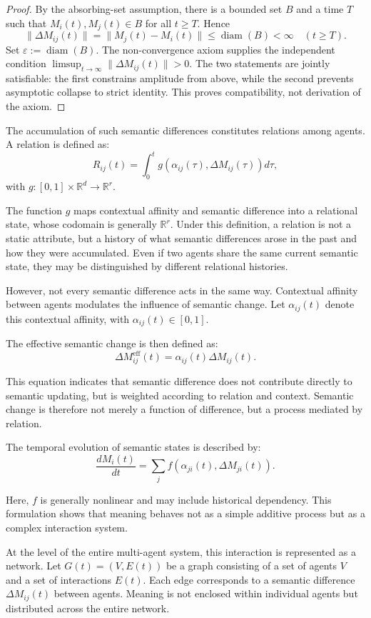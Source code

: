 \documentclass[11pt,a4paper]{article}
\theoremstyle{definition}
\begin{document}
\begin{proof}
By the absorbing-set assumption, there is a bounded set $B$ and a time $T$ such that $M_i(t),M_j(t)\in B$ for all $t\geq T$. Hence
\[
\|\Delta M_{ij}(t)\| = \|M_j(t)-M_i(t)\| \leq \operatorname{diam}(B) < \infty
\quad (t\geq T).
\]
Set $\varepsilon:=\operatorname{diam}(B)$. The non-convergence axiom supplies the independent condition
$\limsup_{t\to\infty}\|\Delta M_{ij}(t)\|>0$. The two statements are jointly satisfiable: the first constrains amplitude from above, while the second prevents asymptotic collapse to strict identity. This proves compatibility, not derivation of the axiom.
\end{proof}

The accumulation of such semantic differences constitutes relations among agents. A relation is defined as:
\[
R_{ij}(t) = \int_0^t g(\alpha_{ij}(\tau), \Delta M_{ij}(\tau)) d\tau,
\]
with $g : [0, 1] \times \mathbb{R}^d \to \mathbb{R}^r$.

The function $g$ maps contextual affinity and semantic difference into a relational state, whose codomain is generally $\mathbb{R}^r$. Under this definition, a relation is not a static attribute, but a history of what semantic differences arose in the past and how they were accumulated. Even if two agents share the same current semantic state, they may be distinguished by different relational histories.

However, not every semantic difference acts in the same way. Contextual affinity between agents modulates the influence of semantic change. Let $\alpha_{ij}(t)$ denote this contextual affinity, with $\alpha_{ij}(t) \in [0, 1]$.

The effective semantic change is then defined as:
\[
\Delta M^{\text{eff}}_{ij}(t) = \alpha_{ij}(t) \Delta M_{ij}(t).
\]

This equation indicates that semantic difference does not contribute directly to semantic updating, but is weighted according to relation and context. Semantic change is therefore not merely a function of difference, but a process mediated by relation.

The temporal evolution of semantic states is described by:
\[
\frac{dM_i(t)}{dt} = \sum_j f(\alpha_{ji}(t), \Delta M_{ji}(t)).
\]

Here, $f$ is generally nonlinear and may include historical dependency. This formulation shows that meaning behaves not as a simple additive process but as a complex interaction system.

At the level of the entire multi-agent system, this interaction is represented as a network. Let $G(t) = (V, E(t))$ be a graph consisting of a set of agents $V$ and a set of interactions $E(t)$. Each edge corresponds to a semantic difference $\Delta M_{ij}(t)$ between agents. Meaning is not enclosed within individual agents but distributed across the entire network.
\end{document}
